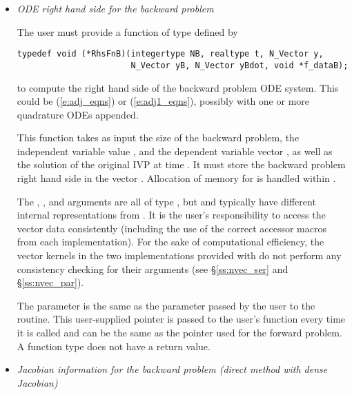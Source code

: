 \begin{itemize}

\item{\em ODE right hand side for the backward problem}

  The user must provide a function of type  defined by
\begin{verbatim}
typedef void (*RhsFnB)(integertype NB, realtype t, N_Vector y, 
                       N_Vector yB, N_Vector yBdot, void *f_dataB);
\end{verbatim}
  to compute the right hand side of the backward problem ODE system.
  This could be (\ref{e:adj_eqns}) or (\ref{e:adj1_eqns}), 
  possibly with one or more quadrature ODEs appended.

  This function takes as input the size  of the backward problem, the 
  independent variable value , and the dependent variable vector ,
  as well as the solution of the original IVP  at time .  
  It must store the backward problem right hand side in the vector .  
  Allocation of memory for  is handled within {\cvodes}.
  
  The , , and  arguments are all of type ,
  but  and   typically have different internal representations
  from . It is the user's 
  responsibility to access the vector data consistently (including the use of the 
  correct accessor macros from each {\nvector} implementation). For the sake of 
  computational efficiency, the vector kernels in the two {\nvector} implementations 
  provided with {\cvodes} do not perform any consistency checking for their 
   arguments (see \S\ref{ss:nvec_ser} and \S\ref{ss:nvec_par}).

  The  parameter is the same as the  parameter passed by 
  the user to the  routine. This user-supplied pointer is passed to 
  the user's  function every time it is called and can be the same as the 
   pointer used for the forward problem.
  A  function type does not have a return value.

\item {\em Jacobian information for the backward problem
    (direct method with dense Jacobian)}
  

\end{itemize}
